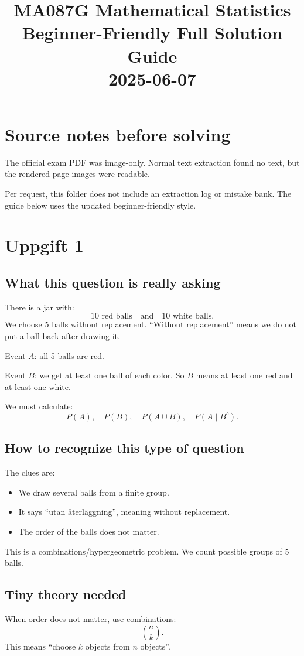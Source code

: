 \documentclass[11pt,a4paper]{article}
\title{MA087G Mathematical Statistics\\Beginner-Friendly Full Solution Guide\\2025-06-07}
\author{}
\date{}
\begin{document}
\maketitle

\section*{Source notes before solving}
The official exam PDF was image-only. Normal text extraction found no text, but the rendered page images were readable.

Per request, this folder does not include an extraction log or mistake bank. The guide below uses the updated beginner-friendly style.

\section*{Uppgift 1}

\subsection*{What this question is really asking}
There is a jar with:
\[
10 \text{ red balls} \quad \text{and} \quad 10 \text{ white balls}.
\]
We choose 5 balls without replacement. ``Without replacement'' means we do not put a ball back after drawing it.

Event \(A\): all 5 balls are red.

Event \(B\): we get at least one ball of each color. So \(B\) means at least one red and at least one white.

We must calculate:
\[
P(A),\quad P(B),\quad P(A\cup B),\quad P(A\mid B^c).
\]

\subsection*{How to recognize this type of question}
The clues are:
\begin{itemize}[leftmargin=*]
    \item We draw several balls from a finite group.
    \item It says ``utan återläggning'', meaning without replacement.
    \item The order of the balls does not matter.
\end{itemize}

This is a combinations/hypergeometric problem. We count possible groups of 5 balls.

\subsection*{Tiny theory needed}
When order does not matter, use combinations:
\[
\binom{n}{k}.
\]
This means ``choose \(k\) objects from \(n\) objects''.
\end{document}

